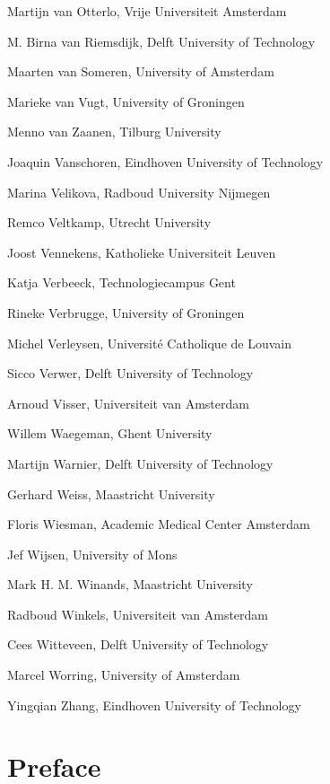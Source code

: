 \documentclass[a4paper,oneside]{book}
\makeatletter
\newcommand\MakePlainPagestyleEmpty{\let\ps@plain\ps@empty}
\makeatother
\begin{document}
\begin{compactitem}[]
		\item[] Martijn van Otterlo, Vrije Universiteit Amsterdam
		\item[] M. Birna van Riemsdijk, Delft University of Technology
		\item[] Maarten van Someren, University of Amsterdam
		\item[] Marieke van Vugt, University of Groningen
		\item[] Menno van Zaanen, Tilburg University
		\item[] Joaquin Vanschoren, Eindhoven University of Technology
		\item[] Marina Velikova, Radboud University Nijmegen
		\item[] Remco Veltkamp, Utrecht University
		\item[] Joost Vennekens, Katholieke Universiteit Leuven
		\item[] Katja Verbeeck, Technologiecampus Gent
		\item[] Rineke Verbrugge, University of Groningen
		\item[] Michel Verleysen, Universit\'e Catholique de Louvain
		\item[] Sicco Verwer, Delft University of Technology
		\item[] Arnoud Visser, Universiteit van Amsterdam
		\item[] Willem Waegeman, Ghent University
		\item[] Martijn Warnier, Delft University of Technology
		\item[] Gerhard Weiss, Maastricht University
		\item[] Floris Wiesman, Academic Medical Center Amsterdam
		\item[] Jef Wijsen, University of Mons
		\item[] Mark H. M. Winands, Maastricht University
		\item[] Radboud Winkels, Universiteit van Amsterdam
		\item[] Cees Witteveen, Delft University of Technology
		\item[] Marcel Worring, University of Amsterdam
		\item[] Yingqian Zhang, Eindhoven University of Technology
	\end{compactitem}

\section*{Preface}
\lipsum[1-10]

\newpage
{}
\tableofcontents

\mainmatter
\MakePlainPagestyleEmpty



\printindex[authors]


\end{document}
